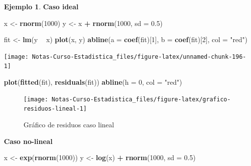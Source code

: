 \documentclass[
  12pt,
]{book}
\newenvironment{Shaded}{\begin{snugshade}}{\end{snugshade}}
\newcommand{\DataTypeTok}[1]{\textcolor[rgb]{0.13,0.29,0.53}{#1}}
\newcommand{\DecValTok}[1]{\textcolor[rgb]{0.00,0.00,0.81}{#1}}
\newcommand{\FloatTok}[1]{\textcolor[rgb]{0.00,0.00,0.81}{#1}}
\newcommand{\KeywordTok}[1]{\textcolor[rgb]{0.13,0.29,0.53}{\textbf{#1}}}
\newcommand{\NormalTok}[1]{#1}
\newcommand{\OperatorTok}[1]{\textcolor[rgb]{0.81,0.36,0.00}{\textbf{#1}}}
\newcommand{\StringTok}[1]{\textcolor[rgb]{0.31,0.60,0.02}{#1}}
\theoremstyle{definition}
\theoremstyle{definition}
\newtheorem{example}{Ejemplo}[chapter]
\theoremstyle{definition}
\theoremstyle{remark}
\begin{document}
\begin{example}

\textbf{Caso ideal}

\begin{Shaded}
\begin{Highlighting}[]
\NormalTok{x <-}\StringTok{ }\KeywordTok{rnorm}\NormalTok{(}\DecValTok{1000}\NormalTok{)}
\NormalTok{y <-}\StringTok{ }\NormalTok{x }\OperatorTok{+}\StringTok{ }\KeywordTok{rnorm}\NormalTok{(}\DecValTok{1000}\NormalTok{, }\DataTypeTok{sd =} \FloatTok{0.5}\NormalTok{)}

\NormalTok{fit <-}\StringTok{ }\KeywordTok{lm}\NormalTok{(y }\OperatorTok{~}\StringTok{ }\NormalTok{x)}
\KeywordTok{plot}\NormalTok{(x, y)}
\KeywordTok{abline}\NormalTok{(}\DataTypeTok{a =} \KeywordTok{coef}\NormalTok{(fit)[}\DecValTok{1}\NormalTok{], }\DataTypeTok{b =} \KeywordTok{coef}\NormalTok{(fit)[}\DecValTok{2}\NormalTok{], }\DataTypeTok{col =} \StringTok{"red"}\NormalTok{)}
\end{Highlighting}
\end{Shaded}

\begin{center}\texttt{[image: Notas-Curso-Estadistica\_files/figure-latex/unnamed-chunk-196-1]} \end{center}

\begin{Shaded}
\begin{Highlighting}[]
\KeywordTok{plot}\NormalTok{(}\KeywordTok{fitted}\NormalTok{(fit), }\KeywordTok{residuals}\NormalTok{(fit))}
\KeywordTok{abline}\NormalTok{(}\DataTypeTok{h =} \DecValTok{0}\NormalTok{, }\DataTypeTok{col =} \StringTok{"red"}\NormalTok{)}
\end{Highlighting}
\end{Shaded}

\begin{figure}

{\centering \texttt{[image: Notas-Curso-Estadistica\_files/figure-latex/grafico-residuos-lineal-1]} 

}

\caption{Gráfico de residuos caso lineal}\label{fig:grafico-residuos-lineal}
\end{figure}

\textbf{Caso no-lineal}

\begin{Shaded}
\begin{Highlighting}[]
\NormalTok{x <-}\StringTok{ }\KeywordTok{exp}\NormalTok{(}\KeywordTok{rnorm}\NormalTok{(}\DecValTok{1000}\NormalTok{))}
\NormalTok{y <-}\StringTok{ }\KeywordTok{log}\NormalTok{(x) }\OperatorTok{+}\StringTok{ }\KeywordTok{rnorm}\NormalTok{(}\DecValTok{1000}\NormalTok{, }\DataTypeTok{sd =} \FloatTok{0.5}\NormalTok{)}


\end{Highlighting}
\end{Shaded}
\end{example}
\end{document}
